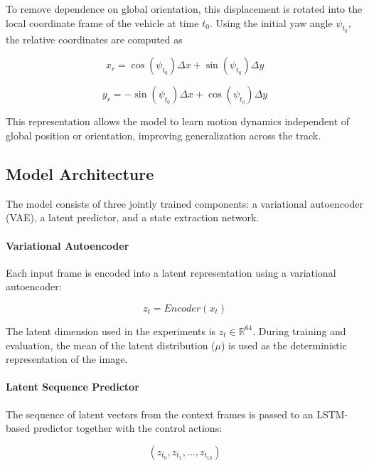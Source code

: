 \documentclass[preprint,12pt]{elsarticle}
\begin{document}
To remove dependence on global orientation, this displacement is rotated into the local coordinate frame of the vehicle at time $t_0$. Using the initial yaw angle $\psi_{t_0}$, the relative coordinates are computed as

\begin{equation}
x_r = \cos(\psi_{t_0})\Delta x + \sin(\psi_{t_0})\Delta y
\end{equation}

\begin{equation}
y_r = -\sin(\psi_{t_0})\Delta x + \cos(\psi_{t_0})\Delta y
\end{equation}

This representation allows the model to learn motion dynamics independent of global position or orientation, improving generalization across the track.

\subsection{Model Architecture}

The model consists of three jointly trained components: a variational autoencoder (VAE), a latent predictor, and a state extraction network.

\paragraph{Variational Autoencoder}

Each input frame is encoded into a latent representation using a variational autoencoder:

\begin{equation}
z_t = Encoder(x_t)
\end{equation}

The latent dimension used in the experiments is $z_t \in \mathbb{R}^{64}$. During training and evaluation, the mean of the latent distribution ($\mu$) is used as the deterministic representation of the image.

\paragraph{Latent Sequence Predictor}

The sequence of latent vectors from the context frames is passed to an LSTM-based predictor together with the control actions:

\begin{equation}
(z_{t_0}, z_{t_1}, \ldots, z_{t_{13}})
\end{equation}
\end{document}
